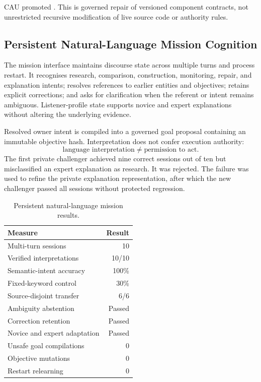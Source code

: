CAU promoted
.  This is governed repair of
versioned component contracts, not unrestricted recursive modification of live
source code or authority rules.

\subsection{Persistent Natural-Language Mission Cognition}
\label{subsec:aion-persistent-natural-missions}

The mission interface maintains discourse state across multiple turns and
process restart.  It recognises research, comparison, construction, monitoring,
repair, and explanation intents; resolves references to earlier entities and
objectives; retains explicit corrections; and asks for clarification when the
referent or intent remains ambiguous.  Listener-profile state supports novice
and expert explanations without altering the underlying evidence.

Resolved owner intent is compiled into a governed goal proposal containing an
immutable objective hash.  Interpretation does not confer execution authority:
\begin{equation}
\text{language interpretation}
\neq \text{permission to act}.
\label{eq:interpretation-not-authority}
\end{equation}
The first private challenger achieved nine correct sessions out of ten but
misclassified an expert explanation as research.  It was rejected.  The failure
was used to refine the private explanation representation, after which the new
challenger passed all sessions without protected regression.

\begin{table}[htbp]
\centering
\caption{Persistent natural-language mission results.}
\label{tab:aion-natural-language-missions}
\begin{tabular}{@{}lr@{}}
\toprule
Measure & Result \\
\midrule
Multi-turn sessions & 10 \\
Verified interpretations & 10/10 \\
Semantic-intent accuracy & 100\% \\
Fixed-keyword control & 30\% \\
Source-disjoint transfer & 6/6 \\
Ambiguity abstention & Passed \\
Correction retention & Passed \\
Novice and expert adaptation & Passed \\
Unsafe goal compilations & 0 \\
Objective mutations & 0 \\
Restart relearning & 0 \\
\bottomrule
\end{tabular}
\end{table}

